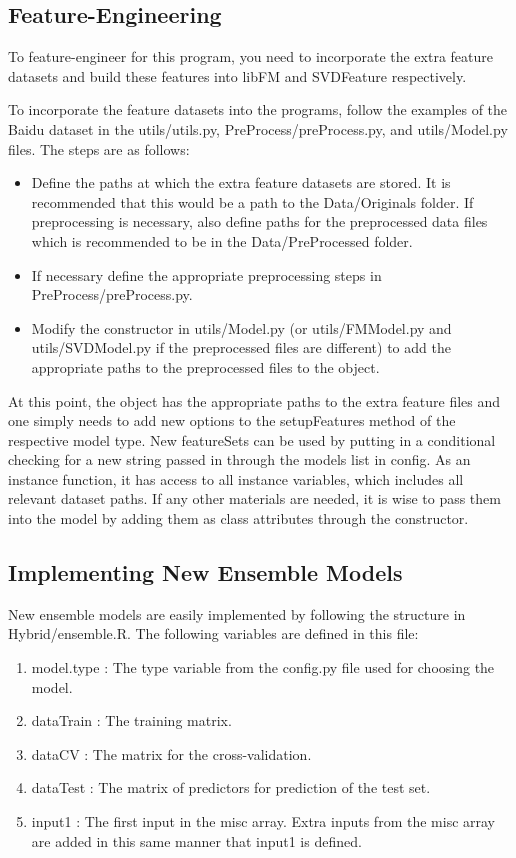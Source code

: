 \documentclass{article}
\begin{document}
\subsection{Feature-Engineering}

To feature-engineer for this program, you need to incorporate the extra feature datasets and build these features into libFM and SVDFeature respectively.

To incorporate the feature datasets into the programs, follow the examples of the Baidu dataset in the utils/utils.py, PreProcess/preProcess.py, and utils/Model.py files. The steps are as follows:

\begin{itemize}
\item Define the paths at which the extra feature datasets are stored. It is recommended that this would be a path to the Data/Originals folder. If preprocessing is necessary, also define paths for the preprocessed data files which is recommended to be in the Data/PreProcessed folder.
\item If necessary define the appropriate preprocessing steps in PreProcess/preProcess.py.
\item Modify the constructor in utils/Model.py (or utils/FMModel.py and utils/SVDModel.py if the preprocessed files are different) to add the appropriate paths to the preprocessed files to the object. 
\end{itemize}

At this point, the object has the appropriate paths to the extra feature files and one simply needs to add new options to the setupFeatures method of the respective model type. New featureSets can be used by putting in a conditional checking for a new string passed in through the models list in config. As an instance function, it has access to all instance variables, which includes all relevant dataset paths. If any other materials are needed, it is wise to pass them into the model by adding them as class attributes through the constructor.

\subsection{Implementing New Ensemble Models}

New ensemble models are easily implemented by following the structure in Hybrid/ensemble.R. The following variables are defined in this file:

\begin{enumerate}
\item model.type : The type variable from the config.py file used for choosing the model. 
\item dataTrain : The training matrix.
\item dataCV : The matrix for the cross-validation.
\item dataTest : The matrix of predictors for prediction of the test set.
\item input1 : The first input in the misc array. Extra inputs from the misc array are added in this same manner that input1 is defined.
\end{enumerate}
\end{document}
